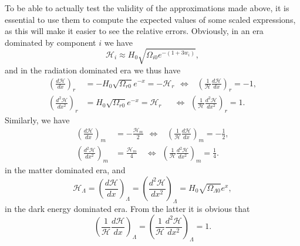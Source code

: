 \documentclass{aa}
\begin{document}
To be able to actually test the validity of the approximations made above, it is essential to use them to compute the expected values of some scaled expressions, as this will make it easier to see the relative errors. Obviously, in an era dominated by component $i$ we have
\begin{equation}
    \mathcal{H}_i \approx H_0\sqrt{\Omega_{i0}e^{-(1+3w_i)}},
\end{equation}
and in the radiation dominated era we thus have
\begin{align}
  \left(\frac{d\mathcal{H}}{dx}\right)_r &= -H_0\sqrt{\Omega_{r0}}e^{-x}=-\mathcal{H}_r 
  \hspace{5pt}\Leftrightarrow\hspace{9pt}\left(\frac{1}{\mathcal{H}}\frac{d\mathcal{H}}{dx}\right)_r=-1,
  \\
  \left(\frac{d^2\mathcal{H}}{dx^2}\right)_r &= H_0\sqrt{\Omega_{r0}}e^{-x}=\mathcal{H}_r
  \hspace{18pt}\Leftrightarrow\hspace{5pt}\left(\frac{1}{\mathcal{H}}\frac{d^2\mathcal{H}}{dx^2}\right)_r=1.
\end{align}
Similarly, we have
\begin{align}
  \left(\frac{d\mathcal{H}}{dx}\right)_m &= -\frac{\mathcal{H}_m}{2} 
  \hspace{5pt}\Leftrightarrow\hspace{10pt}\left(\frac{1}{\mathcal{H}}\frac{d\mathcal{H}}{dx}\right)_m=-\frac{1}{2},
  \\
  \left(\frac{d^2\mathcal{H}}{dx^2}\right)_m &= \frac{\mathcal{H}_m}{4}
  \hspace{12pt}\Leftrightarrow\hspace{5pt}\left(\frac{1}{\mathcal{H}}\frac{d^2\mathcal{H}}{dx^2}\right)_m=\frac{1}{4}.
\end{align}
in the matter dominated era, and
\begin{equation}
  \mathcal{H}_\Lambda = \left(\frac{d\mathcal{H}}{dx}\right)_\Lambda = \left(\frac{d^2\mathcal{H}}{dx^2}\right)_\Lambda = H_0\sqrt{\Omega_{\Lambda0}}e^{x},
\end{equation}
in the dark energy dominated era. From the latter it is obvious that
\begin{equation}
  \left(\frac{1}{\mathcal{H}}\frac{d\mathcal{H}}{dx}\right)_\Lambda = \left(\frac{1}{\mathcal{H}}\frac{d^2\mathcal{H}}{dx^2}\right)_\Lambda = 1.
\end{equation} 
\end{document}
